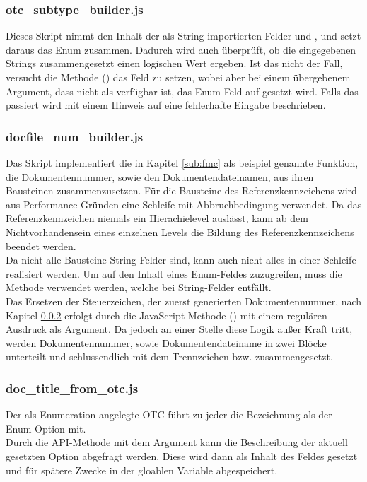 \subsubsection{otc\_subtype\_builder.js}
\label{sub:otcbuilder}
Dieses Skript nimmt den Inhalt der als String importierten Felder  und , und setzt daraus das Enum  zusammen. Dadurch wird auch überprüft, ob die eingegebenen Strings zusammengesetzt einen logischen Wert ergeben. Ist das nicht der Fall, versucht die Methode (\cite{14}) das Feld zu setzen, wobei aber bei einem übergebenem Argument, dass nicht als  verfügbar ist, das Enum-Feld auf  gesetzt wird. Falls das passiert wird  mit einem Hinweis auf eine fehlerhafte Eingabe beschrieben.
\subsubsection{docfile\_num\_builder.js}
\label{sub:docfilenum}
Das Skript implementiert die in Kapitel \ref{sub:fmc} als beispiel genannte Funktion, die Dokumentennummer, sowie den Dokumentendateinamen, aus ihren Bausteinen zusammenzusetzen. Für die Bausteine des Referenzkennzeichens wird aus Performance-Gründen eine Schleife mit Abbruchbedingung verwendet. Da das Referenzkennzeichen niemals ein Hierachielevel auslässt, kann ab dem Nichtvorhandensein eines einzelnen Levels die Bildung des Referenzkennzeichens beendet werden.\\
Da nicht alle Bausteine String-Felder sind, kann auch nicht alles in einer Schleife realisiert werden. Um auf den Inhalt eines Enum-Feldes zuzugreifen, muss die Methode  verwendet werden, welche bei String-Felder entfällt.\\
Das Ersetzen der Steuerzeichen, der zuerst generierten Dokumentennummer, nach Kapitel \ref{sub:docfilenum} erfolgt durch die JavaScript-Methode  (\cite{15}) mit einem regulären Ausdruck als Argument. Da jedoch an einer Stelle diese Logik außer Kraft tritt, werden Dokumentennummer, sowie Dokumentendateiname in zwei Blöcke unterteilt und schlussendlich mit dem Trennzeichen \markss{\-} bzw. \markss{\_} zusammengesetzt.
\subsubsection{doc\_title\_from\_otc.js}
\label{sub:titleotc}
Der als Enumeration angelegte OTC führt zu jeder  die Bezeichnung als  der Enum-Option mit.\\
Durch die API-Methode  mit dem Argument  kann die Beschreibung der aktuell gesetzten Option abgefragt werden. Diese wird dann als Inhalt des Feldes  gesetzt und für spätere Zwecke in der gloablen Variable  abgespeichert.
